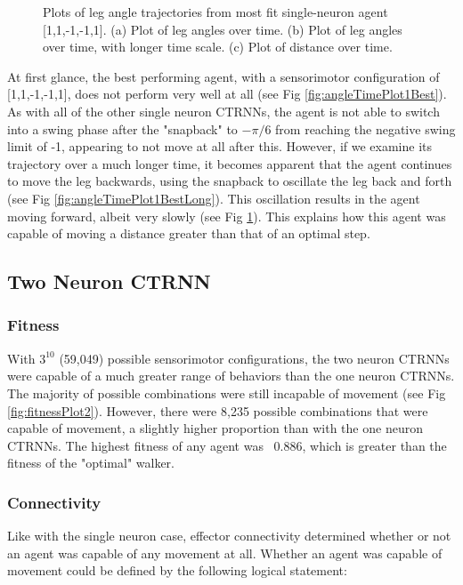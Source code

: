 \documentclass{article}
\begin{document}
\begin{figure}[htbp]
\begin{subfigure}[b]{0.32\textwidth}
    \caption{}
    \label{fig:distPlot1Best}
  \end{subfigure}
  \caption{Plots of leg angle trajectories from most fit single-neuron agent [1,1,-1,-1,1]. (a) Plot of leg angles over time. (b) Plot of leg angles over time, with longer time scale. (c) Plot of distance over time.}
  \label{fig:angleTimePlots1Best}
\end{figure}

At first glance, the best performing agent, with a sensorimotor configuration of [1,1,-1,-1,1], does not perform very well at all (see Fig \ref{fig:angleTimePlot1Best}). As with all of the other single neuron CTRNNs, the agent is not able to switch into a swing phase after the "snapback" to \(-\pi/6\) from reaching the negative swing limit of -1, appearing to not move at all after this. However, if we examine its trajectory over a much longer time, it becomes apparent that the agent continues to move the leg backwards, using the snapback to oscillate the leg back and forth (see Fig \ref{fig:angleTimePlot1BestLong}). This oscillation results in the agent moving forward, albeit very slowly (see Fig \ref{fig:distPlot1Best}). This explains how this agent was capable of moving a distance greater than that of an optimal step. 

\subsection{Two Neuron CTRNN}  

\subsubsection{Fitness}
With \(3^{10}\) (59,049) possible sensorimotor configurations, the two neuron CTRNNs were capable of a much greater range of behaviors than the one neuron CTRNNs. The majority of possible combinations were still incapable of movement (see Fig \ref{fig:fitnessPlot2}). However, there were 8,235 possible combinations that were capable of movement, a slightly higher proportion than with the one neuron CTRNNs. The highest fitness of any agent was ~0.886, which is greater than the fitness of the "optimal" walker. 

\subsubsection{Connectivity}
Like with the single neuron case, effector connectivity determined whether or not an agent was capable of any movement at all. Whether an agent was capable of movement could be defined by the following logical statement:
\end{document}
